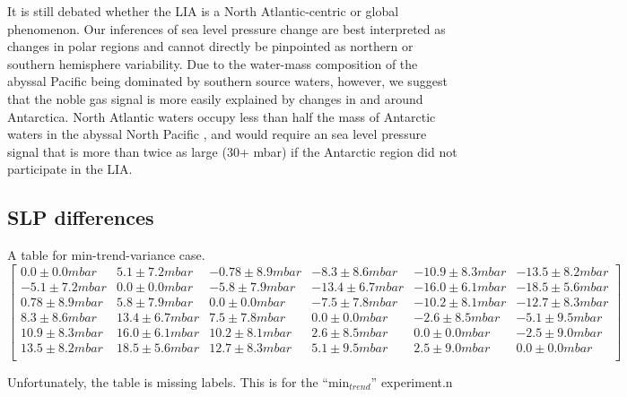 \documentclass[12pt]{article}
\begin{document}
It is still debated whether the LIA is a North Atlantic-centric or
global phenomenon. Our inferences of sea level pressure change are
best interpreted as changes in polar regions and cannot directly be
pinpointed as northern or southern hemisphere variability. Due to the
water-mass composition of the abyssal Pacific being dominated by
southern source waters, however, we suggest that the noble gas signal
is more easily explained by changes in and around Antarctica. North
Atlantic waters occupy less than half the mass of Antarctic waters in
the abyssal North Pacific \cite{Johnson--2008:Quantifying}, and would
require an sea level pressure signal that is more than twice as large
(30+ mbar) if the Antarctic region did not participate in the LIA.

\subsection{SLP differences}
\label{sec:slp-differences}

A table for min-trend-variance case.
\begin{equation}
\left[
\begin{array}{cccccc}
0.0 ± 0.0 mbar & 5.1 ± 7.2 mbar & -0.78 ± 8.9 mbar & -8.3 ± 8.6 mbar & -10.9 ± 8.3 mbar & -13.5 ± 8.2 mbar \\
-5.1 ± 7.2 mbar & 0.0 ± 0.0 mbar & -5.8 ± 7.9 mbar & -13.4 ± 6.7 mbar & -16.0 ± 6.1 mbar & -18.5 ± 5.6 mbar \\
0.78 ± 8.9 mbar & 5.8 ± 7.9 mbar & 0.0 ± 0.0 mbar & -7.5 ± 7.8 mbar & -10.2 ± 8.1 mbar & -12.7 ± 8.3 mbar \\
8.3 ± 8.6 mbar & 13.4 ± 6.7 mbar & 7.5 ± 7.8 mbar & 0.0 ± 0.0 mbar & -2.6 ± 8.5 mbar & -5.1 ± 9.5 mbar \\
10.9 ± 8.3 mbar & 16.0 ± 6.1 mbar & 10.2 ± 8.1 mbar & 2.6 ± 8.5 mbar & 0.0 ± 0.0 mbar & -2.5 ± 9.0 mbar \\
13.5 ± 8.2 mbar & 18.5 ± 5.6 mbar & 12.7 ± 8.3 mbar & 5.1 ± 9.5 mbar & 2.5 ± 9.0 mbar & 0.0 ± 0.0 mbar \\
\end{array}
\right]
\end{equation}


Unfortunately, the table is missing labels. This is for the ``min$_{trend}$'' experiment.n
\end{document}
